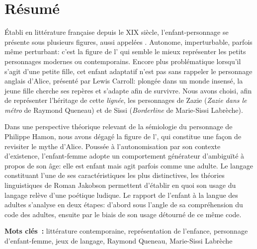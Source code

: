 \chapter*{Résumé}

\begin{spacing}{1.4}

Établi en littérature française depuis le XIX siècle, l'enfant-personnage se présente sous plusieurs figures, aussi appelées .
Autonome, imperturbable, parfois même perturbant: c'est la figure de l' qui semble le mieux représenter les petits personnages modernes ou contemporains.
Encore plus problématique lorsqu'il s'agit d'une petite fille, cet enfant adaptatif n'est pas sans rappeler le personnage anglais d'Alice, présenté par Lewis Carroll: plongée dans un monde insensé, la jeune fille cherche ses repères et s'adapte afin de survivre.
Nous avons choisi, afin de représenter l'héritage de cette \textit{lignée}, les personnages de Zazie (\textit{Zazie dans le métro} de Raymond Queneau) et de Sissi (\textit{Borderline} de Marie-Sissi Labrèche).
\par
Dans une perspective théorique relevant de la sémiologie du personnage de Philippe Hamon, nous avons dégagé la figure de l', qui constitue une façon de revisiter le mythe d'Alice.
Poussée à l'autonomisation par son contexte d'existence, l'enfant-femme adopte un comportement générateur d'ambiguïté à propos de son âge: elle est enfant mais agit parfois comme une adulte.
Le langage constituant l'une de ses caractéristiques les plus distinctives, les théories linguistiques de Roman Jakobson permettent d'établir en quoi son usage du langage relève d'une poétique ludique.
Le rapport de l'enfant à la langue des adultes s'analyse en deux étapes: d'abord sous l'angle de sa compréhension du code des adultes, ensuite par le biais de son usage détourné de ce même code.

\end{spacing}

\bigskip

\begin{singlespace}
\textbf{Mots clés~:}
littérature contemporaine, représentation de l'enfance, personnage d'enfant-femme, jeux de langage, Raymond Queneau, Marie-Sissi Labrèche
\end{singlespace}
